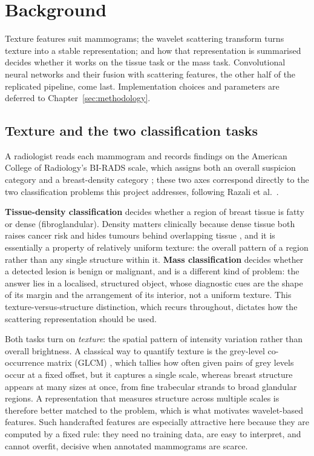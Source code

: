 
\chapter{Background} \label{sec:background}

Texture features suit mammograms; the wavelet scattering transform turns texture into a stable representation; and how that representation is summarised decides whether it works on the tissue task or the mass task. Convolutional neural networks and their fusion with scattering features, the other half of the replicated pipeline, come last. Implementation choices and parameters are deferred to Chapter~\ref{sec:methodology}.

\section{Texture and the two classification tasks}

A radiologist reads each mammogram and records findings on the American College of Radiology's BI-RADS scale, which assigns both an overall suspicion category and a breast-density category \cite{sickles2013acr}; these two axes correspond directly to the two classification problems this project addresses, following Razali et al.\ \cite{razali2023cnn}.

\textbf{Tissue-density classification} decides whether a region of breast tissue is fatty or dense (fibroglandular). Density matters clinically because dense tissue both raises cancer risk and hides tumours behind overlapping tissue \cite{boyd2007mammographic}, and it is essentially a property of relatively uniform texture: the overall pattern of a region rather than any single structure within it. \textbf{Mass classification} decides whether a detected lesion is benign or malignant, and is a different kind of problem: the answer lies in a localised, structured object, whose diagnostic cues are the shape of its margin and the arrangement of its interior, not a uniform texture. This texture-versus-structure distinction, which recurs throughout, dictates how the scattering representation should be used.

Both tasks turn on \emph{texture}: the spatial pattern of intensity variation rather than overall brightness. A classical way to quantify texture is the grey-level co-occurrence matrix (GLCM) \cite{haralick1973textural}, which tallies how often given pairs of grey levels occur at a fixed offset, but it captures a single scale, whereas breast structure appears at many sizes at once, from fine trabecular strands to broad glandular regions. A representation that measures structure across multiple scales is therefore better matched to the problem, which is what motivates wavelet-based features. Such handcrafted features are especially attractive here because they are computed by a fixed rule: they need no training data, are easy to interpret, and cannot overfit, decisive when annotated mammograms are scarce.

